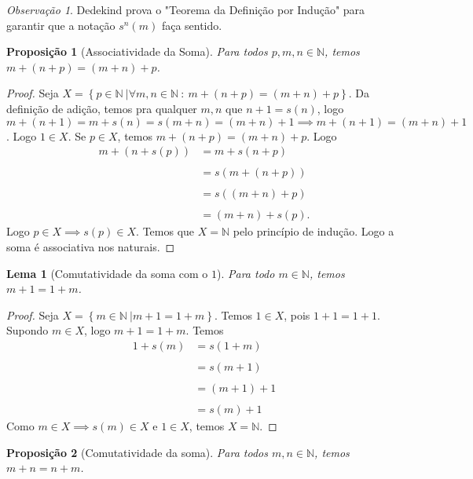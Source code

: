 \documentclass{article}
\theoremstyle{plain}
\newtheorem{prop}{Proposição}[section]
\newtheorem{lema}{Lema}
\theoremstyle{definition}
\theoremstyle{remark}
\newtheorem{obs}{Observação}[section]
\begin{document}
\begin{obs}
	Dedekind prova o "Teorema da Definição por Indução" para garantir que a notação $s^n(m)$ faça sentido.
\end{obs}
\begin{prop}[Associatividade da Soma]
	Para todos $p,m,n \in \mathbb{N}$, temos $m+(n+p) = (m+n) +p$.
\end{prop}
\begin{proof}
	Seja $X = \left\{ p \in \mathbb{N} \: | \forall m,n\in \mathbb{N} \: : \: m+(n+p) = (m+n) + p \right\}$. Da definição de adição, temos pra qualquer $m,n$ que $n+1 = s(n)$, logo $m+(n+1)  = m+s(n) = s(m+n) = (m+n) +1 \implies m+(n+1) = (m+n) +1 $. Logo $1\in X$.  Se $p \in X$, temos $m+(n+p) = (m+n) +p $. Logo \begin{align*} 
		m+(n+s(p)) &= m+ s(n+p) \\~\\
		&= s\left(m+(n+p)\right) \\~\\ 
		&= s\left((m+n)+p\right) \\~\\ 
		&= (m+n) + s(p).
	\end{align*}
	Logo $p \in X \implies s(p) \in X$. Temos que $X =  \mathbb{N}$ pelo princípio de indução. Logo a soma é associativa nos naturais.
\end{proof}
\begin{lema}[Comutatividade da soma com o $1$]
	\label{lema1}
	Para todo $m \in \mathbb{N}$, temos $m+1 = 1 +m$.
\end{lema}
\begin{proof}
	Seja $X = \left\{ m \in \mathbb{N} \: |  m+1 = 1+m \right\}$. Temos $1\in X$, pois $1+1 = 1+1$. Supondo $m\in X$, logo $m+1 = 1+m$. Temos \begin{align*} 
		1+ s(m)  &= s(1+m) \\~ \\
		&= s(m+1) \\~\\
		&= (m+1) +1 \\~\\
		&= s(m)+1
	\end{align*}
	Como $m\in X \implies s(m) \in X$ e $1\in X$, temos $X= \mathbb{N}$.
\end{proof}
\begin{prop}[Comutatividade da soma]
	Para todos $m,n \in \mathbb{N}$, temos $m+n = n +m$.
\end{prop}
\end{document}
